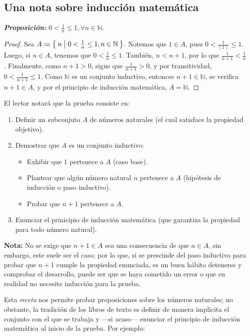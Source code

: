 \documentclass[11pt]{article}
\newcommand{\N}{\mathbb{N}}
\newcommand{\defined}{\coloneqq}
\newcommand{\bfit}[1]{\textbf{\textit{#1}}}
\let\set\Set
\begin{document}
\pagebreak

\subsection*{Una nota sobre inducción matemática}

\bfit{Proposición:} $0<\frac{1}{n}\leq 1, \forall n\in \N$. \begin{proof}
  Sea $A \defined \set{n|0<\frac{1}{n} \leq 1, n\in \N}$. Notemos que $1\in A$, pues $0<\frac{1}{(1)} \leq 1$. Luego, si $n\in A$, tenemos que $0<\frac{1}{n} \leq 1$. También, $n<n+1$, por lo que $\frac{1}{n+1} < \frac{1}{n}$. Finalmente, como $n+1>0$, sigue que $\frac{1}{n+1}>0$, y por transitividad, $0<\frac{1}{n+1}\leq 1$. Como $\N$ es un conjunto inductivo, entonces $n+1\in \N$, se verifica $n+1\in A$, y por el principio de inducción matemática, $A =\N$.
\end{proof}

El lector notará que la prueba consiste en: \begin{enumerate}
  \item Definir un subconjuto $A$ de números naturales (el cual satisface la propiedad objetivo).
  \item Demostrar que $A$ es un conjunto inductivo: \begin{itemize}
    \item Exhibir que $1$ pertenece a $A$ (caso base).
    \item Plantear que algún número natural $n$ pertenece a $A$ (hipótesis de inducción o paso inductivo).
    \item Probar que $n+1$ pertenece a $A$.
  \end{itemize}
  \item Enunciar el prinicipio de inducción matemática (que garantiza la propiedad para todo número natural).
\end{enumerate}

\textbf{Nota:} No se exige que $n+1\in A$ sea una consecuencia de que $n\in A$, sin embargo, este suele ser el caso; por lo que, si se prescinde del paso inductivo para probar que $n+1$ cumple la propiedad enunciada, es un buen hábito detenerse y comprobar el desarrollo, puede ser que se haya cometido un error o que en realidad no necesite inducción para la prueba.

Esta \textit{receta} nos permite probar proposiciones sobre los números naturales; no obstante, la tradición de los libros de texto es definir de manera implícita el conjunto con el que se trabaja y —si acaso— enunciar el principio de inducción matemática al inicio de la prueba. Por ejemplo:
\end{document}
